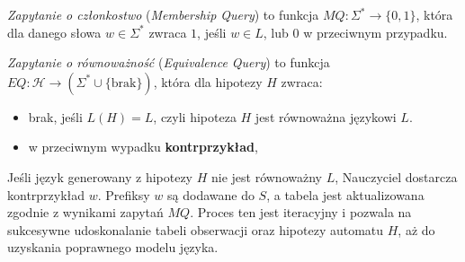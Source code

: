 \begin{definition}
    \emph{Zapytanie o członkostwo} (\emph{Membership Query}) to funkcja \( MQ: \Sigma^* \to \{0, 1\} \), która dla danego słowa \( w \in \Sigma^* \) zwraca \( 1 \), jeśli \( w \in L \), lub \( 0 \) w przeciwnym przypadku.
\end{definition}

\begin{definition}
    \emph{Zapytanie o równoważność} (\emph{Equivalence Query}) to funkcja \( EQ: \mathcal{H} \to (\Sigma^* \cup \{\text{brak}\}) \), która dla hipotezy \( H \) zwraca:
    \begin{itemize}
        \item brak, jeśli \( L(H) = L \), czyli hipoteza \( H \) jest równoważna językowi \( L \).
        \item w przeciwnym wypadku \textbf{kontrprzykład},
    \end{itemize}
\end{definition}


Jeśli język generowany z hipotezy \( H \) nie jest równoważny \( L \), Nauczyciel dostarcza kontrprzykład \( w \). Prefiksy \( w \) są dodawane do \( S \), a tabela jest aktualizowana zgodnie z wynikami zapytań \( MQ \). Proces ten jest iteracyjny i pozwala na sukcesywne udoskonalanie tabeli obserwacji oraz hipotezy automatu \( H \), aż do uzyskania poprawnego modelu języka.




